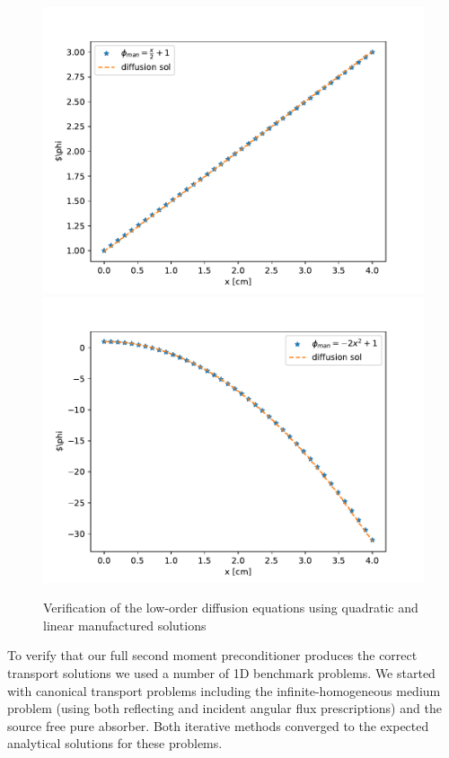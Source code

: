 \begin{figure}
    \centering
    \includegraphics[width=.49\linewidth]{figures/smm_paper/linear_mms.pdf}
    \includegraphics[width=.49\linewidth]{figures/smm_paper/quadratic_mms.pdf}
    \caption{Verification of the low-order diffusion equations using quadratic and linear manufactured solutions}
    \label{fig:diffusion_mms}
\end{figure}

To verify that our full second moment preconditioner produces the correct transport solutions we used a number of 1D benchmark problems.
We started with canonical transport problems including the infinite-homogeneous medium problem (using both reflecting and incident angular flux prescriptions) and the source free pure absorber.
Both iterative methods converged to the expected analytical solutions for these problems.

